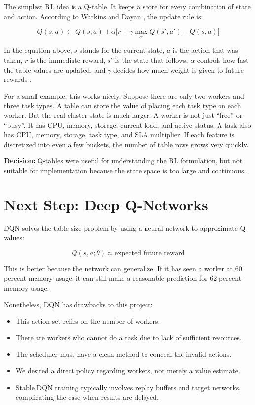 The simplest RL idea is a Q-table. It keeps a score for every combination of state and action. According to Watkins and Dayan \cite{watkins1992qlearning}, the update rule is:

\[
Q(s,a) \leftarrow Q(s,a) + \alpha \bigl[r + \gamma \max_{a'} Q(s',a') - Q(s,a)\bigr]
\]

In the equation above, \(s\) stands for the current state, \(a\) is the action that was taken, \(r\) is the immediate reward, \(s'\) is the state that follows, \(\alpha\) controls how fast the table values are updated, and \(\gamma\) decides how much weight is given to future rewards \cite{watkins1992qlearning}.

For a small example, this works nicely. Suppose there are only two workers and three task types. A table can store the value of placing each task type on each worker. But the real cluster state is much larger. A worker is not just ``free'' or ``busy''. It has CPU, memory, storage, current load, and active status. A task also has CPU, memory, storage, task type, and SLA multiplier. If each feature is discretized into even a few buckets, the number of table rows grows very quickly.

\textbf{Decision:} Q-tables were useful for understanding the RL formulation, but not suitable for implementation because the state space is too large and continuous.

\section{Next Step: Deep Q-Networks}

DQN solves the table-size problem by using a neural network to approximate Q-values:

\[
Q(s,a;\theta) \approx \text{expected future reward}
\]

This is better because the network can generalize. If it has seen a worker at 60 percent memory usage, it can still make a reasonable prediction for 62 percent memory usage.


Nonetheless, DQN has drawbacks to this project:

\begin{itemize}
    \item This action set relies on the number of workers.
    \item There are workers who cannot do a task due to lack of sufficient resources.
    \item The scheduler must have a clean method to conceal the invalid actions.
    \item We desired a direct policy regarding workers, not merely a value estimate.
    \item Stable DQN training typically involves replay buffers and target networks, complicating the case when results are delayed.
\end{itemize}

